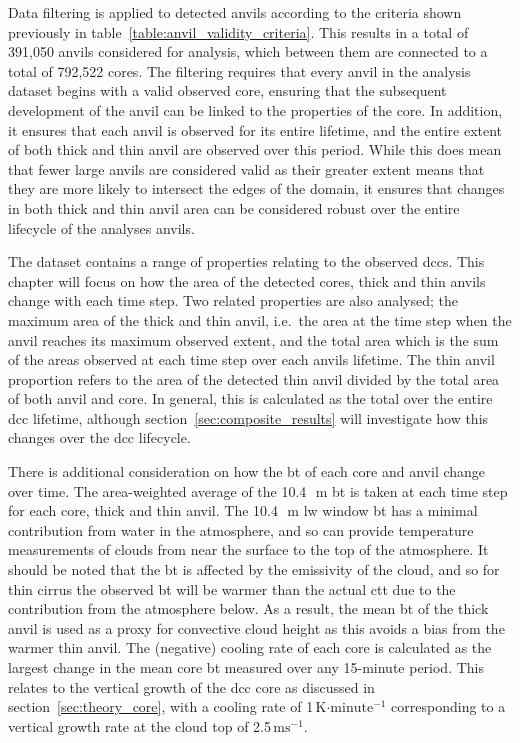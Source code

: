 Data filtering is applied to detected anvils according to the criteria shown previously in table~\ref{table:anvil_validity_criteria}.
This results in a total of 391,050 anvils considered for analysis, which between them are connected to a total of 792,522 cores.
The filtering requires that every anvil in the analysis dataset begins with a valid observed core, ensuring that the subsequent development of the anvil can be linked to the properties of the core.
In addition, it ensures that each anvil is observed for its entire lifetime, and the entire extent of both thick and thin anvil are observed over this period.
While this does mean that fewer large anvils are considered valid as their greater extent means that they are more likely to intersect the edges of the domain, it ensures that changes in both thick and thin anvil area can be considered robust over the entire lifecycle of the analyses anvils.

The dataset contains a range of properties relating to the observed \acrshort{dcc}s.
This chapter will focus on how the area of the detected cores, thick and thin anvils change with each time step.
Two related properties are also analysed; the maximum area of the thick and thin anvil, i.e.\ the area at the time step when the anvil reaches its maximum observed extent, and the total area which is the sum of the areas observed at each time step over each anvils lifetime.
The thin anvil proportion refers to the area of the detected thin anvil divided by the total area of both anvil and core.
In general, this is calculated as the total over the entire \acrshort{dcc} lifetime, although section~\ref{sec:composite_results} will investigate how this changes over the \acrshort{dcc} lifecycle.

There is additional consideration on how the \acrshort{bt} of each core and anvil change over time.
The area-weighted average of the 10.4\,\unit{\mu m} \acrshort{bt} is taken at each time step for each core, thick and thin anvil.
The 10.4\,\unit{\mu m} \acrshort{lw} window \acrshort{bt} has a minimal contribution from water in the atmosphere, and so can provide temperature measurements of clouds from near the surface to the top of the atmosphere.
It should be noted that the \acrshort{bt} is affected by the emissivity of the cloud, and so for thin cirrus the observed \acrshort{bt} will be warmer than the actual \acrshort{ctt} due to the contribution from the atmosphere below.
As a result, the mean \acrshort{bt} of the thick anvil is used as a proxy for convective cloud height as this avoids a bias from the warmer thin anvil.
The (negative) cooling rate of each core is calculated as the largest change in the mean core \acrshort{bt} measured over any 15-minute period.
This relates to the vertical growth of the \acrshort{dcc} core as discussed in section~\ref{sec:theory_core}, with a cooling rate of 1\,K$\cdot\mathrm{minute^{-1}}$ corresponding to a vertical growth rate at the cloud top of 2.5\,$\mathrm{ms^{-1}}$.

